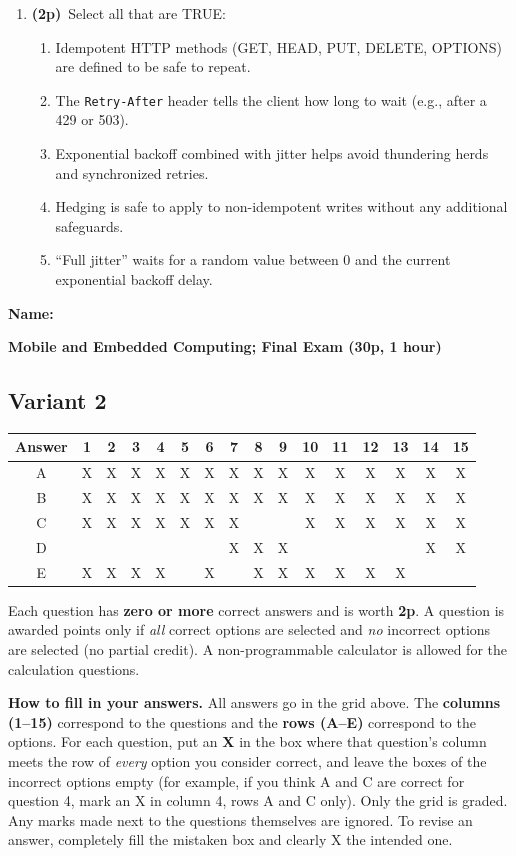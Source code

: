 \documentclass[11pt]{article}
\newcommand{\pts}{\textbf{(2p)}~}
\newcommand{\nameheader}{%
  \noindent\textbf{Name:}~\underline{\hspace{8cm}}\par\vspace{4pt}
}
\newcommand{\examtitle}{%
  \begin{center}
  {\large\bfseries Mobile and Embedded Computing; Final Exam (30p, 1 hour)}
  \end{center}
  \vspace{-4pt}
}
\newcommand{\answergridtwo}{%
  \begin{center}
  \renewcommand{\arraystretch}{1.6}
  \begin{tabular}{|c|*{15}{c|}}
  \hline
  Answer & 1 & 2 & 3 & 4 & 5 & 6 & 7 & 8 & 9 & 10 & 11 & 12 & 13 & 14 & 15 \\
  \hline
  A & X & X & X & X & X & X & X & X & X & X & X & X & X & X & X \\
  \hline
  B & X & X & X & X & X & X & X & X & X & X & X & X & X & X & X \\
  \hline
  C & X & X & X & X & X & X & X &   &   & X & X & X & X & X & X \\
  \hline
  D &   &   &   &   &   &   & X & X & X &   &   &   &   & X & X \\
  \hline
  E & X & X & X & X &   & X &   & X & X & X & X & X & X &   &   \\
  \hline
  \end{tabular}
  \end{center}
}
\newcommand{\instructions}{%
  \small
  \noindent Each question has \textbf{zero or more} correct answers and is worth \textbf{2p}. A question is awarded points only if \emph{all} correct options are selected and \emph{no} incorrect options are selected (no partial credit). A non-programmable calculator is allowed for the calculation questions.

  \smallskip
  \noindent\textbf{How to fill in your answers.} All answers go in the grid above. The \textbf{columns (1--15)} correspond to the questions and the \textbf{rows (A--E)} correspond to the options. For each question, put an \textbf{X} in the box where that question's column meets the row of \emph{every} option you consider correct, and leave the boxes of the incorrect options empty (for example, if you think A and C are correct for question 4, mark an X in column 4, rows A and C only). Only the grid is graded. Any marks made next to the questions themselves are ignored. To revise an answer, completely fill the mistaken box and clearly X the intended one.
  \normalsize\par\smallskip
}
\begin{document}
\begin{enumerate}
    \item \pts Select all that are TRUE:
    \begin{enumerate}
      \item Idempotent HTTP methods (GET, HEAD, PUT, DELETE, OPTIONS) are defined to be safe to repeat.
      \item The \texttt{Retry-After} header tells the client how long to wait (e.g., after a 429 or 503).
      \item Exponential backoff combined with jitter helps avoid thundering herds and synchronized retries.
      \item Hedging is safe to apply to non-idempotent writes without any additional safeguards.
      \item ``Full jitter'' waits for a random value between 0 and the current exponential backoff delay.
    \end{enumerate}

  \end{enumerate}

  \newpage

  \nameheader
  \examtitle

  \subsection*{Variant 2}

  \answergridtwo

  \instructions
\end{document}
